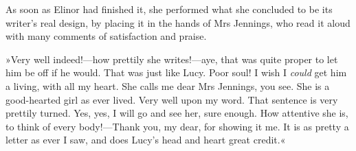 As soon as Elinor had finished it, she performed what she concluded to be its writer’s real design, by placing it in the hands of Mrs Jennings, who read it aloud with many comments of satisfaction and praise.

»Very well indeed!—how prettily she writes!—aye, that was quite proper to let him be off if he would. That was just like Lucy. Poor soul! I wish I \textit{could} get him a living, with all my heart. She calls me dear Mrs Jennings, you see. She is a good-hearted girl as ever lived. Very well upon my word. That sentence is very prettily turned. Yes, yes, I will go and see her, sure enough. How attentive she is, to think of every body!—Thank you, my dear, for showing it me. It is as pretty a letter as ever I saw, and does Lucy’s head and heart great credit.«